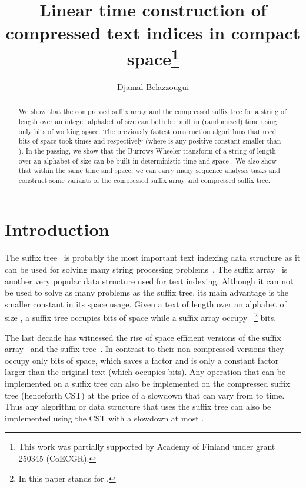 \documentclass[a4paper]{article}
\begin{document}
\title{Linear time construction of compressed text indices in compact space\thanks{This work was partially supported by Academy of Finland under grant 250345 (CoECGR).}}
\author{Djamal Belazzougui}

\maketitle
\begin{abstract}
We show that the compressed suffix array and the compressed suffix tree for a string of length  over 
an integer alphabet of size  can both be built in  (randomized) 
time  using only  bits of working space. The previously fastest construction algorithms 
that used  bits of space took times  and 
respectively (where  is any positive constant smaller than ). 
In the passing, we show that the Burrows-Wheeler transform of a string of length  over 
an alphabet of size  can be built in deterministic  time and space 
. 
We also show that within the same time and space, we can carry many sequence analysis tasks
and construct some variants of the compressed suffix array and compressed suffix tree.

\end{abstract}
\section{Introduction}
The suffix tree~\cite{Wei73} is probably the most important text indexing data structure as it can be used for solving many string processing problems~\cite{Ap85,Gu97}. The suffix array~\cite{MM93} is another very popular data structure used for text indexing. 
Although it can not be used to solve as many problems as the suffix tree, its main advantage is the smaller constant in its space usage. 
Given a text of length  over an alphabet of 
size , a suffix tree occupies  bits of space while a suffix array occupy 
~\footnote{In this paper  stands for .} bits. 

The last decade has witnessed the rise of space efficient versions of the suffix array~\cite{GV05,FM05} and the suffix tree~\cite{Sa07a}. In contrast to their non compressed versions they occupy only  bits of space, which saves a factor  and is only a constant factor larger than the original text (which occupies  bits). 
Any operation that can be implemented on a suffix tree can also be implemented on the compressed suffix tree (henceforth \textsc{CST}) at the price of a slowdown that can vary from  to  time. Thus any algorithm or data structure that uses the suffix tree can also be implemented using the \textsc{CST} with a slowdown at most . 
\end{document}
